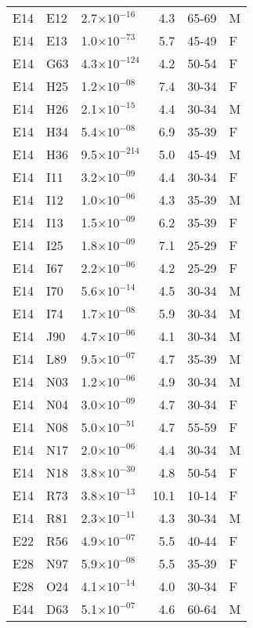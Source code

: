 \begin{longtable}{lllrll}
   E14 & E12 & 2.7$\times10^{-16}$ & 4.3 & 65-69 & M \\ 
   E14 & E13 & 1.0$\times10^{-73}$ & 5.7 & 45-49 & F \\ 
   E14 & G63 & 4.3$\times10^{-124}$ & 4.2 & 50-54 & F \\ 
   E14 & H25 & 1.2$\times10^{-08}$ & 7.4 & 30-34 & F \\ 
   E14 & H26 & 2.1$\times10^{-15}$ & 4.4 & 30-34 & M \\ 
   E14 & H34 & 5.4$\times10^{-08}$ & 6.9 & 35-39 & F \\ 
   E14 & H36 & 9.5$\times10^{-214}$ & 5.0 & 45-49 & M \\ 
   E14 & I11 & 3.2$\times10^{-09}$ & 4.4 & 30-34 & F \\ 
   E14 & I12 & 1.0$\times10^{-06}$ & 4.3 & 35-39 & M \\ 
   E14 & I13 & 1.5$\times10^{-09}$ & 6.2 & 35-39 & F \\ 
   E14 & I25 & 1.8$\times10^{-09}$ & 7.1 & 25-29 & F \\ 
   E14 & I67 & 2.2$\times10^{-06}$ & 4.2 & 25-29 & F \\ 
   E14 & I70 & 5.6$\times10^{-14}$ & 4.5 & 30-34 & M \\ 
   E14 & I74 & 1.7$\times10^{-08}$ & 5.9 & 30-34 & M \\ 
   E14 & J90 & 4.7$\times10^{-06}$ & 4.1 & 30-34 & M \\ 
   E14 & L89 & 9.5$\times10^{-07}$ & 4.7 & 35-39 & M \\ 
   E14 & N03 & 1.2$\times10^{-06}$ & 4.9 & 30-34 & M \\ 
   E14 & N04 & 3.0$\times10^{-09}$ & 4.7 & 30-34 & F \\ 
   E14 & N08 & 5.0$\times10^{-51}$ & 4.7 & 55-59 & F \\ 
   E14 & N17 & 2.0$\times10^{-06}$ & 4.4 & 30-34 & M \\ 
   E14 & N18 & 3.8$\times10^{-30}$ & 4.8 & 50-54 & F \\ 
   E14 & R73 & 3.8$\times10^{-13}$ & 10.1 & 10-14 & F \\ 
   E14 & R81 & 2.3$\times10^{-11}$ & 4.3 & 30-34 & M \\ 
   E22 & R56 & 4.9$\times10^{-07}$ & 5.5 & 40-44 & F \\ 
   E28 & N97 & 5.9$\times10^{-08}$ & 5.5 & 35-39 & F \\ 
   E28 & O24 & 4.1$\times10^{-14}$ & 4.0 & 30-34 & F \\ 
   E44 & D63 & 5.1$\times10^{-07}$ & 4.6 & 60-64 & M \\ 

\end{longtable}

